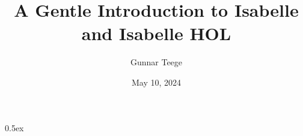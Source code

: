 \documentclass[11pt,a4paper]{report}
\begin{document}
\title{A Gentle Introduction to Isabelle and Isabelle HOL}
\author{Gunnar Teege}
\date{May 10, 2024}
\maketitle

\tableofcontents

\parindent 0pt\parskip 0.5ex



%
%
\end{document}
